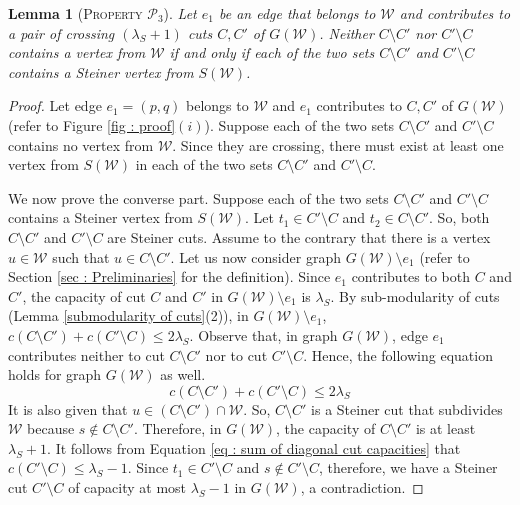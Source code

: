 \documentclass[letterpaper,11pt]{article}
\newtheorem{lemma}{Lemma}[]
\begin{document}
\begin{lemma} [\textsc{Property ${\mathcal P}_3$}] \label{lem : property p3}
    Let $e_1$ be an edge that belongs to ${\mathcal W}$ and contributes to a pair of crossing $(\lambda_S+1)$ cuts $C,C'$ of $G({\mathcal W})$. Neither $C\setminus C'$ nor $C'\setminus C$ contains a vertex from ${\mathcal W}$ if and only if each of the two sets $C\setminus C'$ and $C'\setminus C$ contains a Steiner vertex from $S({\mathcal W})$.
\end{lemma} 
\begin{proof}
    Let edge $e_1=(p,q)$ belongs to ${\mathcal W}$ and $e_1$ contributes to $C,C'$ of $G({\mathcal W})$ (refer to Figure \ref{fig : proof}$(i)$). Suppose each of the two sets $C\setminus C'$ and $C'\setminus C$ contains no vertex from ${\mathcal W}$. Since they are crossing, there must exist at least one vertex from $S({\mathcal W})$ in each of the two sets $C\setminus C'$ and $C'\setminus C$.

    We now prove the converse part. Suppose each of the two sets $C\setminus C'$ and $C'\setminus C$ contains a Steiner vertex from $S({\mathcal W})$. Let $t_1\in C'\setminus C$ and $t_2\in C\setminus C'$. So, both $C\setminus C'$ and $C'\setminus C$ are Steiner cuts. Assume to the contrary that there is a vertex $u\in {\mathcal W}$ such that $u\in C\setminus C'$. Let us now consider graph $G({\mathcal W})\setminus e_1$ (refer to Section \ref{sec : Preliminaries} for the definition). Since $e_1$ contributes to both $C$ and $C'$, the capacity of cut $C$ and $C'$ in $G({\mathcal W})\setminus e_1$ is $\lambda_S$. By sub-modularity of cuts (Lemma \ref{submodularity of cuts}(2)), in $G({\mathcal W})\setminus e_1$, $c(C\setminus C')+c(C'\setminus C)\le 2\lambda_S$. Observe that, in graph $G({\mathcal W})$, edge $e_1$ contributes neither to cut $C\setminus C'$ nor to cut $C'\setminus C$. Hence, the following equation holds for graph $G({\mathcal W})$ as well. 
    \begin{equation} \label{eq : sum of diagonal cut capacities}
        c(C\setminus C')+c(C'\setminus C)\le 2\lambda_S
    \end{equation}
It is also given that $u\in (C\setminus C')\cap {\mathcal W}$. So, $C\setminus C'$ is a Steiner cut that subdivides ${\mathcal W}$ because $s\notin C\setminus C'$. Therefore, in $G({\mathcal W})$, the capacity of $C\setminus C'$ is at least $\lambda_S+1$. It follows from Equation \ref{eq : sum of diagonal cut capacities} that $c(C'\setminus C)\le \lambda_S-1$. Since $t_1\in C'\setminus C$ and $s\notin C'\setminus C$, therefore, we have a Steiner cut $C'\setminus C$ of capacity at most $\lambda_S-1$ in $G({\mathcal W})$, a contradiction.       
\end{proof}
\end{document}
